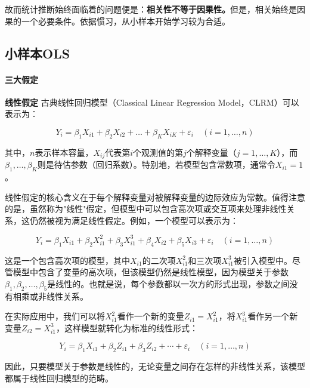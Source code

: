 故而统计推断始终面临着的问题便是：\textbf{相关性不等于因果性。}但是，相关始终是因果的一个必要条件。依据惯习，从小样本开始学习较为合适。

\subsection{小样本OLS}

\paragraph*{三大假定}

\textbf{线性假定}
古典线性回归模型（Classical Linear Regression Model，CLRM）可以表示为：

\begin{equation}
Y_i = \beta_1 X_{i1} + \beta_2 X_{i2} + \ldots + \beta_K X_{iK} + \varepsilon_i \quad (i=1,\ldots,n)
\end{equation}

其中，$n$表示样本容量，$X_{ij}$代表第$i$个观测值的第$j$个解释变量（$j = 1, \ldots, K$），而$\beta_1, \ldots, \beta_K$则是待估参数（回归系数）。特别地，若模型包含常数项，通常令$X_{i1}=1$。

线性假定的核心含义在于每个解释变量对被解释变量的边际效应为常数。值得注意的是，虽然称为"线性"假定，但模型中可以包含高次项或交互项来处理非线性关系，这仍然被视为满足线性假定。例如，一个模型可以表示为：

\begin{equation}
	Y_i = \beta_1 X_{i1} + \beta_2 X_{i1}^2 + \beta_3 X_{i1}^3 + \beta_4 X_{i2} + \beta_5 X_{i3} + \varepsilon_i \quad (i=1,\ldots,n)
\end{equation}

这是一个包含高次项的模型，其中$X_{i1}$的二次项$X_{i1}^2$和三次项$X_{i1}^3$被引入模型中。尽管模型中包含了变量的高次项，但该模型仍然是线性模型，因为模型关于参数$\beta_1, \beta_2, \ldots, \beta_{5}$是线性的。也就是说，每个参数都以一次方的形式出现，参数之间没有相乘或非线性关系。

在实际应用中，我们可以将$X_{i1}^2$看作一个新的变量$Z_{i1}=X_{i1}^2$，将$X_{i1}^3$看作另一个新变量$Z_{i2}=X_{i1}^3$，这样模型就转化为标准的线性形式：

\begin{equation}
	Y_i = \beta_1 X_{i1} + \beta_2 Z_{i1} + \beta_3 Z_{i2} + \cdots + \varepsilon_i \quad (i=1,\ldots,n)
\end{equation}

因此，只要模型关于参数是线性的，无论变量之间存在怎样的非线性关系，该模型都属于线性回归模型的范畴。

